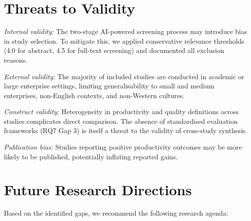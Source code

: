 \documentclass[journal,twoside,10pt]{IEEEtran}
\begin{document}
\section{Threats to Validity}
\label{sec:threats}

\textit{Internal validity:} The two-stage AI-powered screening process may
introduce bias in study selection. To mitigate this, we applied conservative
relevance thresholds (4.0 for abstract, 4.5 for full-text screening) and
documented all exclusion reasons.

\textit{External validity:} The majority of included studies are conducted in
academic or large enterprise settings, limiting generalisability to small and
medium enterprises, non-English contexts, and non-Western cultures.

\textit{Construct validity:} Heterogeneity in productivity and quality
definitions across studies complicates direct comparison. The absence of
standardised evaluation frameworks (RQ7 Gap 3) is itself a threat to the
validity of cross-study synthesis.

\textit{Publication bias:} Studies reporting positive productivity outcomes may
be more likely to be published, potentially inflating reported gains.

\section{Future Research Directions}
\label{sec:future}

Based on the identified gaps, we recommend the following research agenda:
\end{document}
